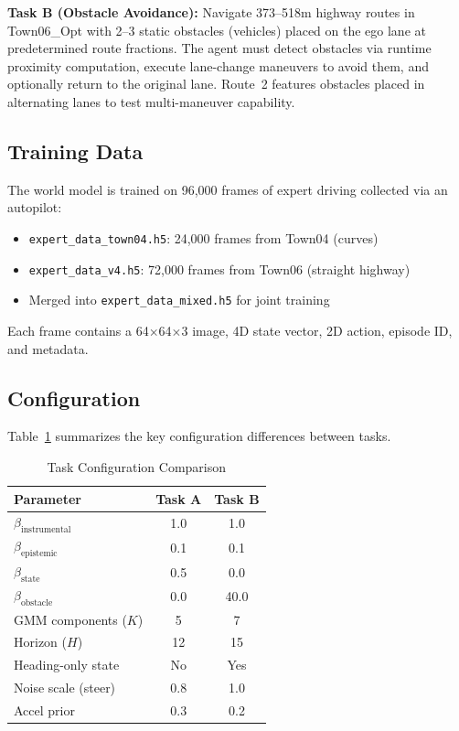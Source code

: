 \documentclass[conference]{IEEEtran}
\begin{document}
\textbf{Task B (Obstacle Avoidance):} Navigate 373--518m highway routes in Town06\_Opt with 2--3 static obstacles (vehicles) placed on the ego lane at predetermined route fractions. The agent must detect obstacles via runtime proximity computation, execute lane-change maneuvers to avoid them, and optionally return to the original lane. Route~2 features obstacles placed in alternating lanes to test multi-maneuver capability.

\subsection{Training Data}

The world model is trained on 96,000 frames of expert driving collected via an autopilot:
\begin{itemize}
    \item \texttt{expert\_data\_town04.h5}: 24,000 frames from Town04 (curves)
    \item \texttt{expert\_data\_v4.h5}: 72,000 frames from Town06 (straight highway)
    \item Merged into \texttt{expert\_data\_mixed.h5} for joint training
\end{itemize}
Each frame contains a 64$\times$64$\times$3 image, 4D state vector, 2D action, episode ID, and metadata.

\subsection{Configuration}

Table~\ref{tab:config} summarizes the key configuration differences between tasks.

\begin{table}[t]
\centering
\caption{Task Configuration Comparison}
\label{tab:config}
\begin{tabular}{lcc}
\toprule
\textbf{Parameter} & \textbf{Task A} & \textbf{Task B} \\
\midrule
$\beta_{\text{instrumental}}$ & 1.0 & 1.0 \\
$\beta_{\text{epistemic}}$ & 0.1 & 0.1 \\
$\beta_{\text{state}}$ & 0.5 & 0.0 \\
$\beta_{\text{obstacle}}$ & 0.0 & 40.0 \\
GMM components ($K$) & 5 & 7 \\
Horizon ($H$) & 12 & 15 \\
Heading-only state & No & Yes \\
Noise scale (steer) & 0.8 & 1.0 \\
Accel prior & 0.3 & 0.2 \\
\bottomrule
\end{tabular}
\end{table}
\end{document}
